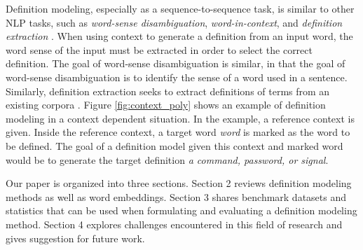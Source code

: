 Definition modeling, especially as a sequence-to-sequence task, is similar to
other NLP tasks, such as \textit{word-sense disambiguation},
\textit{word-in-context}, and \textit{definition extraction}
\cite{bevilacqua_generationary_2020, huang_cdm_2021}. When using context to
generate a definition from an input word, the word sense of the input must be
extracted in order to select the correct definition. The goal of word-sense
disambiguation is similar, in that the goal of word-sense disambiguation is to
identify the sense of a word used in a sentence. Similarly, definition
extraction seeks to extract definitions of terms from an existing corpora
\cite{huang_cdm_2021}. Figure \ref{fig:context_poly} shows an example of
definition modeling in a context dependent situation. In the example, a
reference context is given. Inside the reference context, a target word
\textit{word} is marked as the word to be defined. The goal of a definition
model given this context and marked word would be to generate the target
definition \textit{a command, password, or signal}.

Our paper is organized into three sections. Section 2 reviews definition
modeling methods as well as word embeddings. Section 3 shares benchmark datasets
and statistics that can be used when formulating and evaluating a definition
modeling method. Section 4 explores challenges encountered in this field of
research and gives suggestion for future work.
